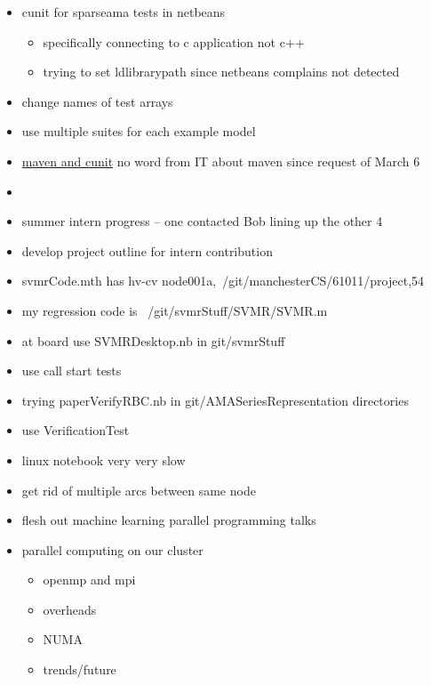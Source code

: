 \documentclass[hyperref]{labbook}
\begin{document}

\begin{itemize}
\item cunit for sparseama tests in netbeans
  \begin{itemize}
  \item specifically connecting to c application not c++
  \item trying to set ldlibrarypath since netbeans complains not detected
  \end{itemize}

\item change names of test arrays
\item use multiple suites for each example model 
\item \href{http://stackoverflow.com/questions/19354321/integration-of-c-c-unit-test-with-maven}{maven and cunit}  no word from IT about maven since request of March 6
\item 
\end{itemize}

\begin{itemize}
\item summer intern progress -- one contacted Bob lining up the other 4
\item develop project outline for intern contribution
\item svmrCode.mth has  hv-cv {node001a,~/git/manchesterCS/61011/project,54}
\item my regression code is ~/git/svmrStuff/SVMR/SVMR.m
\item at board use SVMRDesktop.nb in git/svmrStuff
\end{itemize}

\begin{itemize}
\item use  call start  tests 
\item trying paperVerifyRBC.nb in git/AMASeriesRepresentation directories
\item use VerificationTest 
\item linux notebook very very slow
\item get rid of multiple arcs between same node
\end{itemize}


\begin{itemize}
\item flesh out machine learning parallel programming talks
\item parallel computing on our cluster
  \begin{itemize}
  \item openmp and mpi
  \item overheads
  \item NUMA
  \item trends/future
  \end{itemize}
\end{itemize}
\end{document}
